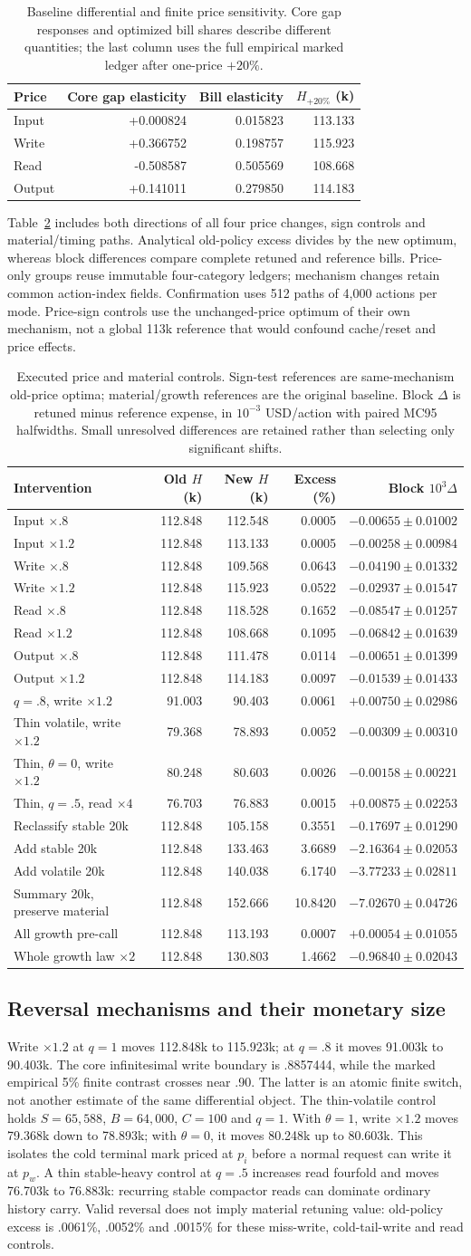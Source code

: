 \documentclass[sigconf,screen,nonacm]{acmart}
\makeatletter
\newcommand{\PaperPriceElasticities}{%
\begin{tabular}{@{}lrrr@{}}\toprule
Price & Core gap elasticity & Bill elasticity & $H_{+20\%}$ (k)\\\midrule
Input & +0.000824 & 0.015823 & 113.133\\
Write & +0.366752 & 0.198757 & 115.923\\
Read & -0.508587 & 0.505569 & 108.668\\
Output & +0.141011 & 0.279850 & 114.183\\\bottomrule
\end{tabular}}
\newcommand{\PaperPriceControls}{%
\begin{tabular}{@{}lrrrr@{}}\toprule
Intervention & Old $H$ (k) & New $H$ (k) & Excess (\%) & Block $10^3\Delta$\\\midrule
Input $\times.8$ & 112.848 & 112.548 & 0.0005 & $-0.00655\pm0.01002$\\
Input $\times1.2$ & 112.848 & 113.133 & 0.0005 & $-0.00258\pm0.00984$\\
Write $\times.8$ & 112.848 & 109.568 & 0.0643 & $-0.04190\pm0.01332$\\
Write $\times1.2$ & 112.848 & 115.923 & 0.0522 & $-0.02937\pm0.01547$\\
Read $\times.8$ & 112.848 & 118.528 & 0.1652 & $-0.08547\pm0.01257$\\
Read $\times1.2$ & 112.848 & 108.668 & 0.1095 & $-0.06842\pm0.01639$\\
Output $\times.8$ & 112.848 & 111.478 & 0.0114 & $-0.00651\pm0.01399$\\
Output $\times1.2$ & 112.848 & 114.183 & 0.0097 & $-0.01539\pm0.01433$\\
$q=.8$, write $\times1.2$ & 91.003 & 90.403 & 0.0061 & $+0.00750\pm0.02986$\\
Thin volatile, write $\times1.2$ & 79.368 & 78.893 & 0.0052 & $-0.00309\pm0.00310$\\
Thin, $\theta=0$, write $\times1.2$ & 80.248 & 80.603 & 0.0026 & $-0.00158\pm0.00221$\\
Thin, $q=.5$, read $\times4$ & 76.703 & 76.883 & 0.0015 & $+0.00875\pm0.02253$\\
Reclassify stable 20k & 112.848 & 105.158 & 0.3551 & $-0.17697\pm0.01290$\\
Add stable 20k & 112.848 & 133.463 & 3.6689 & $-2.16364\pm0.02053$\\
Add volatile 20k & 112.848 & 140.038 & 6.1740 & $-3.77233\pm0.02811$\\
Summary 20k, preserve material & 112.848 & 152.666 & 10.8420 & $-7.02670\pm0.04726$\\
All growth pre-call & 112.848 & 113.193 & 0.0007 & $+0.00054\pm0.01055$\\
Whole growth law $\times2$ & 112.848 & 130.803 & 1.4662 & $-0.96840\pm0.02043$\\\bottomrule
\end{tabular}}
\makeatother
\begin{document}
\begin{table}[t]
\centering\small
\caption{Baseline differential and finite price sensitivity. Core gap
responses and optimized bill shares describe different quantities; the
last column uses the full empirical marked ledger after one-price $+20\%$.}
\label{tab:price-elasticity}\PaperPriceElasticities
\end{table}

Table~\ref{tab:price-controls} includes both directions of all four price
changes, sign controls and material/timing paths. Analytical old-policy
excess divides by the new optimum, whereas block differences compare
complete retuned and reference bills. Price-only groups reuse immutable
four-category ledgers; mechanism changes retain common action-index fields.
Confirmation uses 512 paths of 4,000 actions per mode. Price-sign controls
use the unchanged-price optimum of their own mechanism, not a global
113k reference that would confound cache/reset and price effects.

\begin{table}[t]
\centering\footnotesize\setlength{\tabcolsep}{3pt}
\caption{Executed price and material controls. Sign-test references are
same-mechanism old-price optima; material/growth references are the original
baseline. Block $\Delta$ is retuned minus reference expense, in
$10^{-3}$ USD/action with paired MC95 halfwidths. Small unresolved
differences are retained rather than selecting only significant shifts.}
\label{tab:price-controls}\PaperPriceControls
\end{table}

\subsection{Reversal mechanisms and their monetary size}
Write $\times1.2$ at $q=1$ moves 112.848k to 115.923k; at $q=.8$
it moves 91.003k to 90.403k. The core infinitesimal write boundary is
.8857444, while the marked empirical 5\% finite contrast crosses near
.90. The latter is an atomic finite switch, not another estimate of the
same differential object.
The thin-volatile control holds $S=65,588$, $B=64,000$, $C=100$ and
$q=1$. With $\theta=1$, write $\times1.2$ moves 79.368k down to
78.893k; with $\theta=0$, it moves 80.248k up to 80.603k. This isolates
the cold terminal mark priced at $p_i$ before a normal request can write
it at $p_w$. A thin stable-heavy control at $q=.5$ increases read fourfold
and moves 76.703k to 76.883k: recurring stable compactor reads can dominate
ordinary history carry. Valid reversal does not imply material retuning
value: old-policy excess is .0061\%, .0052\% and .0015\% for these
miss-write, cold-tail-write and read controls.
\end{document}
